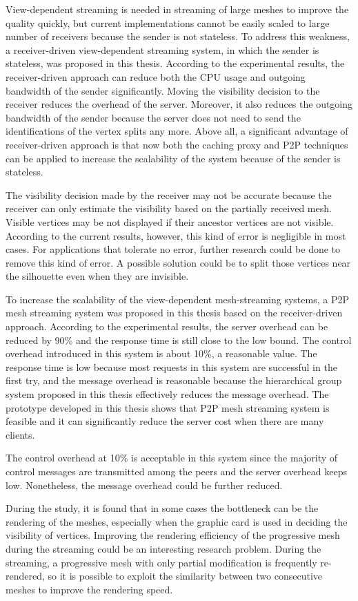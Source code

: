 \documentclass[11pt, a4paper]{report}
\begin{document}
View-dependent streaming is needed in streaming of large meshes
to improve the quality quickly, but current implementations cannot be easily scaled
to large number of receivers because the sender is not stateless. 
To address this weakness, a receiver-driven view-dependent streaming system,
in which the sender is stateless, was proposed in this thesis. 
According to the experimental results, the receiver-driven approach
can reduce both the CPU usage and outgoing bandwidth of the sender significantly. 
Moving the visibility decision to the receiver reduces the overhead of the server. 
Moreover, it also reduces the outgoing bandwidth of the sender because the server
does not need to send the identifications of the vertex splits any more. 
Above all, a significant advantage of receiver-driven approach is that
now both the caching proxy and P2P techniques can be applied to increase the scalability of the system
because of the sender is stateless. 

The visibility decision made by the receiver may not be accurate 
because the receiver can only estimate the visibility based on
the partially received mesh. 
Visible vertices may be not displayed if their ancestor vertices are not visible. 
According to the current results, however, this kind of error is negligible in most cases. 
For applications that tolerate no error, 
further research could be done to remove this kind of error. 
A possible solution could be to split those vertices near the silhouette even when they are invisible.

To increase the scalability of the view-dependent mesh-streaming systems, 
a P2P mesh streaming system was proposed in this thesis based on the receiver-driven approach. 
According to the experimental results, the server overhead can be reduced by 90\%
and the response time is still close to the low bound. 
The control overhead introduced in this system is about 10\%, a reasonable value. 
The response time is low because most requests in this system are successful in the first try, 
and the message overhead is reasonable because the hierarchical group system proposed in this thesis effectively 
reduces the message overhead. 
The prototype developed in this thesis shows that P2P mesh streaming system is feasible
and it can significantly reduce the server cost when there are many clients.

The control overhead at 10\% is acceptable in this system since the majority of
control messages are transmitted among the peers and the server overhead keeps low. 
Nonetheless, the message overhead could be further reduced. 

During the study, it is found that in some cases the bottleneck can be the rendering of the meshes, 
especially when the graphic card is used in deciding the visibility of vertices. 
Improving the rendering efficiency of the progressive mesh during the streaming 
could be an interesting research problem.  
During the streaming, a progressive mesh with only partial modification is frequently re-rendered, 
so it is possible to exploit the similarity between two consecutive meshes to improve the rendering speed.


\end{document}
